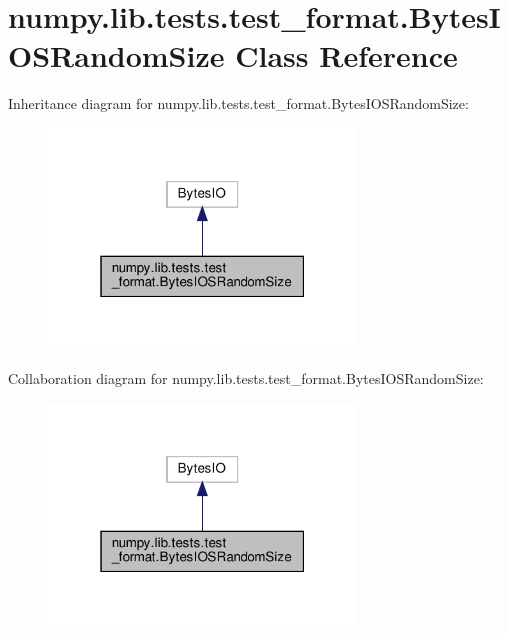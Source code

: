\hypertarget{classnumpy_1_1lib_1_1tests_1_1test__format_1_1BytesIOSRandomSize}{}\section{numpy.\+lib.\+tests.\+test\+\_\+format.\+Bytes\+I\+O\+S\+Random\+Size Class Reference}
\label{classnumpy_1_1lib_1_1tests_1_1test__format_1_1BytesIOSRandomSize}


Inheritance diagram for numpy.\+lib.\+tests.\+test\+\_\+format.\+Bytes\+I\+O\+S\+Random\+Size\+:
\nopagebreak
\begin{figure}[H]
\begin{center}
\leavevmode
\includegraphics[width=232pt]{classnumpy_1_1lib_1_1tests_1_1test__format_1_1BytesIOSRandomSize__inherit__graph}
\end{center}
\end{figure}


Collaboration diagram for numpy.\+lib.\+tests.\+test\+\_\+format.\+Bytes\+I\+O\+S\+Random\+Size\+:
\nopagebreak
\begin{figure}[H]
\begin{center}
\leavevmode
\includegraphics[width=232pt]{classnumpy_1_1lib_1_1tests_1_1test__format_1_1BytesIOSRandomSize__coll__graph}
\end{center}
\end{figure}

